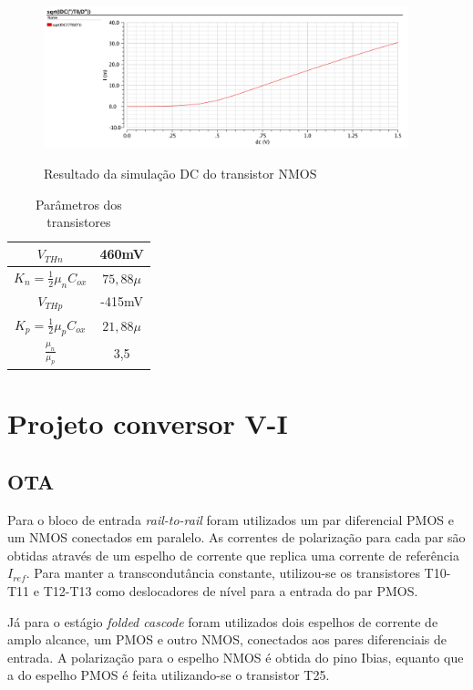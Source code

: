 \documentclass[
	12pt,				%
	oneside,			%
	a4paper,			%
	english,			%
	french,				%
	spanish,			%
	brazil				%
	]{abntex2}
\begin{document}
\begin{figure}[!ht]
  \centering
  \includegraphics[width=300pt]{paramN.PNG}\\
  \caption{Resultado da simulação DC do transistor NMOS}\label{curvaN}
\end{figure}

\begin{table}[h]
    \begin{center}    
    \begin{tabular}{ | c | c | }
    \hline
    \(V_{THn}\) & 460mV \\ 
    \hline
    \(K_n = \frac{1}{2}\mu_{n}C_{ox}\) & $75,88\mu$ \\ 
    \hline
    \(V_{THp}\) & -415mV \\ 
    \hline
    \(K_p = \frac{1}{2}\mu_{p}C_{ox}\) & $21,88\mu$ \\ 
    \hline
    \(\frac{\mu_{n}}{\mu_{p}}\) & 3,5 \\ 
    \hline
    \end{tabular}
    \caption[Parâmetros dos transistores]{Parâmetros dos transistores}
    \label{tabTrans}
    \end{center}
\end{table}

\section{Projeto conversor V-I}
\subsection{OTA}
Para o bloco de entrada \textit{rail-to-rail} foram utilizados um par diferencial PMOS e um NMOS conectados em paralelo. As correntes de polarização para cada par são obtidas através de um espelho de corrente que replica uma corrente de referência $I_{ref}$. Para manter a transcondutância constante, utilizou-se os transistores T10-T11 e T12-T13 como deslocadores de nível para a entrada do par PMOS.

Já para o estágio \textit{folded cascode} foram utilizados dois espelhos de corrente de amplo alcance, um PMOS e outro NMOS, conectados aos pares diferenciais de entrada. A polarização para o espelho NMOS é obtida do pino Ibias, equanto que a do espelho PMOS é feita utilizando-se o transistor T25.
\end{document}

